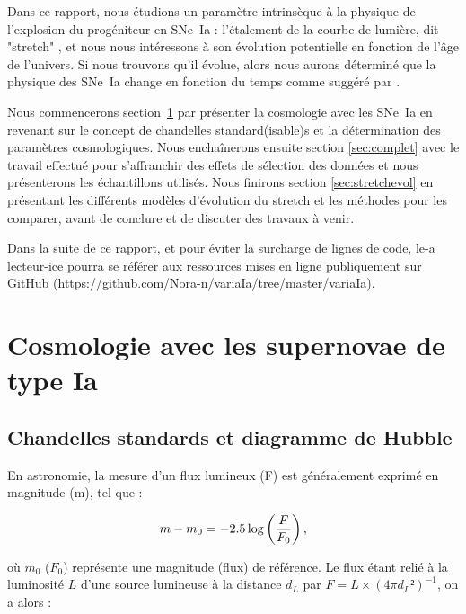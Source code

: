 \documentclass[a4paper, 12pt, svgnames]{article}
\begin{document}
Dans ce rapport, nous étudions un paramètre intrinsèque à la physique de
l'explosion du progéniteur en SNe~Ia : l'étalement de la courbe de lumière, dit
"stretch" \cite{phillips_absolute_1999}, et nous nous intéressons à son
évolution potentielle en fonction de l'âge de l'univers. Si nous trouvons qu'il
évolue, alors nous aurons déterminé que la physique des SNe~Ia change en
fonction du temps comme suggéré par \cite{howell_effect_2009,
rigault_evidence_2013, childress_ages_2014, rigault_strong_2018}. \bigbreak

Nous commencerons section~\ref{sec:cosmo} par présenter la cosmologie avec les
SNe~Ia en revenant sur le concept de chandelles standard(isable)s et la
détermination des paramètres cosmologiques. Nous enchaînerons ensuite section
\ref{sec:complet} avec le travail effectué pour s'affranchir des effets de
sélection des données et nous présenterons les échantillons utilisés. Nous
finirons section \ref{sec:stretchevol} en présentant les différents modèles
d'évolution du stretch et les méthodes pour les comparer, avant de conclure et
de discuter des travaux à venir. \bigbreak

Dans la suite de ce rapport, et pour éviter la surcharge de lignes de code, le-a
lecteur-ice pourra se référer aux ressources mises en ligne publiquement sur
\href{https://github.com/Nora-n/variaIa/tree/master/variaIa}{GitHub}
(https://github.com/Nora-n/variaIa/tree/master/variaIa).

\section{Cosmologie avec les supernovae de type Ia}\label{sec:cosmo}

\subsection{Chandelles standards et diagramme de Hubble}\label{ssec:hub}

En astronomie, la mesure d'un flux lumineux (F) est généralement exprimé en
magnitude (m), tel que :

\begin{equation}
    m - m_0 = -2.5\log\left(\frac{F}{F_0}\right),
\end{equation}

où $m_0$ ($F_0$) représente une magnitude (flux) de référence.
Le flux étant relié à la luminosité $L$ d'une source lumineuse à la distance
$d_L$ par $F = L\times \left(4\pi d_L²\right)^{-1}$, on a alors :
\end{document}
